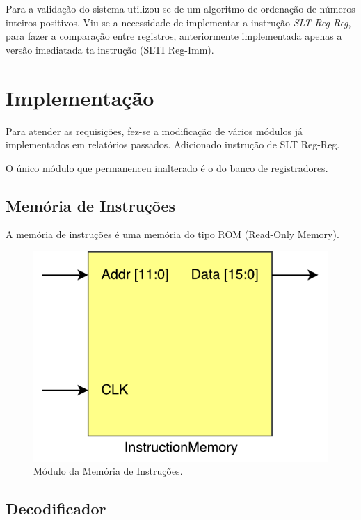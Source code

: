 \documentclass[11pt,a4paper,titlepage]{article}
\begin{document}
Para a validação do sistema utilizou-se de um algoritmo de ordenação de números inteiros positivos. Viu-se a necessidade de implementar a instrução \textit{SLT Reg-Reg}, para fazer a comparação entre registros, anteriormente implementada apenas a versão imediatada ta instrução (SLTI Reg-Imm).

\section{Implementação}

Para atender as requisições, fez-se a modificação de vários módulos já implementados em relatórios passados.
Adicionado instrução de SLT Reg-Reg.

O único módulo que permanenceu inalterado é o do banco de registradores.



\subsection{Memória de Instruções}\label{subsec:imp-instmemory}

A memória de instruções é uma memória do tipo ROM (Read-Only Memory).

\begin{figure}[!h]
\centering
\includegraphics[scale=0.4]{images/InstructionMemory.pdf}
\caption{Módulo da Memória de Instruções.}
\label{fig:instrmemory}
\end{figure}



\subsection{Decodificador}\label{subsec:imp-decode}
\end{document}
